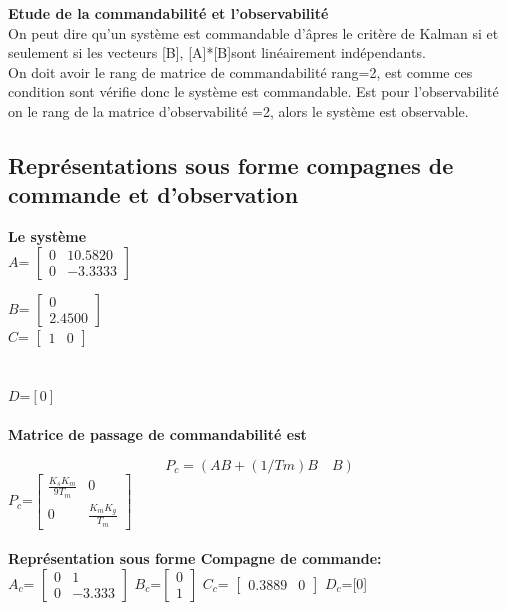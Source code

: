 \textbf{Etude de la commandabilité et l'observabilité}\\
On peut dire qu’un système est commandable   d’âpres   le critère de Kalman si et seulement si les vecteurs [B], [A]*[B]sont linéairement indépendants.\\
On doit avoir le rang de matrice de commandabilité  rang=2, est comme ces condition sont vérifie donc le système est commandable.
Est pour l'observabilité on le rang de la matrice d'observabilité =2, alors le système est observable.

\subsection{Représentations sous forme  compagnes de commande et d'observation}

\textbf{Le système}
\\

$A$=
$\begin{bmatrix} 
0 & 10.5820 \\
0 & -3.3333
\end{bmatrix}
$





$B$=
$\begin{bmatrix} 
0 \\
2.4500  
\end{bmatrix}
$\\


$C$=
$\begin{bmatrix} 
1 & 0 
\end{bmatrix}$
\\\\\\
$D$=$[0]$
\\\\

\textbf{Matrice de passage de commandabilité est}
 

$$ 
P_c = (AB + (1/Tm)B \quad B)
$$
$P_c$=$\begin{bmatrix}
\frac{K_sK_m}{9T_m}&0\\
0&\frac{K_mK_g}{T_m}
\end{bmatrix}$
\\\\

\textbf{Représentation sous forme Compagne de commande:}\\

$A_c$=
$\begin{bmatrix} 
0 & 1 \\
0 & -3.333
\end{bmatrix}$
\quad
$B_c$=$
\begin{bmatrix} 
0 \\
1  
\end{bmatrix}
$
\quad
$C_c$=
$\begin{bmatrix} 
0.3889 &0 
\end{bmatrix}$
\quad
$D_c$=[0]
\\\\

